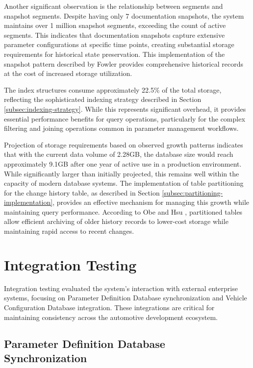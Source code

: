 Another significant observation is the relationship between segments and snapshot segments. Despite having only 7 documentation snapshots, the system maintains over 1 million snapshot segments, exceeding the count of active segments. This indicates that documentation snapshots capture extensive parameter configurations at specific time points, creating substantial storage requirements for historical state preservation. This implementation of the snapshot pattern described by Fowler \cite{fowler2003patterns} provides comprehensive historical records at the cost of increased storage utilization.

The index structures consume approximately 22.5\% of the total storage, reflecting the sophisticated indexing strategy described in Section \ref{subsec:indexing-strategy}. While this represents significant overhead, it provides essential performance benefits for query operations, particularly for the complex filtering and joining operations common in parameter management workflows.

Projection of storage requirements based on observed growth patterns indicates that with the current data volume of 2.28GB, the database size would reach approximately 9.1GB after one year of active use in a production environment. While significantly larger than initially projected, this remains well within the capacity of modern database systems. The implementation of table partitioning for the change history table, as described in Section \ref{subsec:partitioning-implementation}, provides an effective mechanism for managing this growth while maintaining query performance. According to Obe and Hsu \cite{obe2017postgresql}, partitioned tables allow efficient archiving of older history records to lower-cost storage while maintaining rapid access to recent changes.

\section{Integration Testing}
\label{sec:integration-testing}

Integration testing evaluated the system's interaction with external enterprise systems, focusing on Parameter Definition Database synchronization and Vehicle Configuration Database integration. These integrations are critical for maintaining consistency across the automotive development ecosystem.

\subsection{Parameter Definition Database Synchronization}
\label{subsec:pdd-synchronization-testing}

